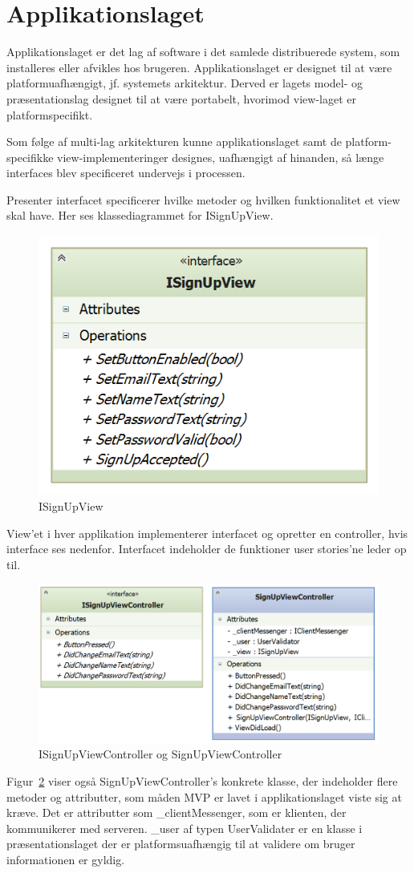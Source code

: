 \section{Applikationslaget}
Applikationslaget er det lag af software i det samlede distribuerede system, som installeres eller afvikles hos brugeren. Applikationslaget er designet til at være platformuafhængigt, jf. systemets arkitektur. Derved er lagets model- og præsentationslag designet til at være portabelt, hvorimod view-laget er platformspecifikt. 

Som følge af multi-lag arkitekturen kunne applikationslaget samt de platform-specifikke view-implementeringer
designes, uafhængigt af hinanden, så længe interfaces blev specificeret undervejs i processen. 

Presenter interfacet specificerer hvilke metoder og hvilken funktionalitet et view skal have.
Her ses klassediagrammet for ISignUpView.

\begin{figure}
\centering
\includegraphics[width=0.35\linewidth]{figs/design/application_isignupview}
\caption{ISignUpView}
\label{fig:application_isignupview}
\end{figure}
View'et i hver applikation implementerer interfacet og opretter en controller, hvis interface ses nedenfor.
Interfacet indeholder de funktioner user stories'ne leder op til.
\begin{figure}
\centering
\includegraphics[width=0.7\linewidth]{figs/design/application_signupviewcontrollerandinterface}
\caption{ISignUpViewController og SignUpViewController}
\label{fig:application_isignupviewcontroller}
\end{figure}
Figur~\ref{fig:application_isignupviewcontroller} viser også SignUpViewController's konkrete klasse, der indeholder flere metoder og attributter, som måden MVP er lavet i applikationslaget viste sig at kræve.
Det er attributter som \_clientMessenger, som er klienten, der kommunikerer med serveren. 
\_user af typen UserValidater er en klasse i præsentationslaget der er platformsuafhængig til at validere om bruger informationen er gyldig. 

